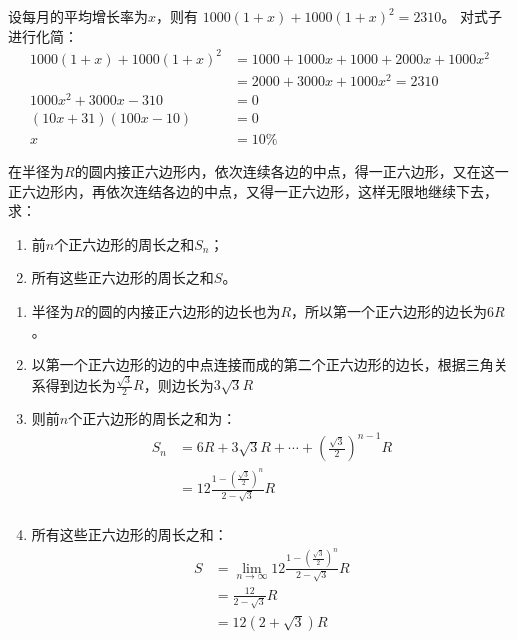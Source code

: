 \documentclass[answers]{exam}
\begin{document}
\begin{questions}
\begin{enumerate}[label=(\arabic*)]
		      \begin{solution}
			      设每月的平均增长率为$x$，则有 	\( 1000(1+x) + 1000(1+x)^2 = 2310 \)。
			      对式子进行化简：
			      \begin{align*}
				      1000(1+x) + 1000(1+x)^2 & = 1000 + 1000x + 1000 + 2000x + 1000x^2 \\
				                              & = 2000 + 3000x + 1000x^2 = 2310         \\
				      1000x^2 +3000x - 310    & = 0                                     \\
				      (10x + 31)(100x - 10)   & = 0                                     \\
				      x                       & = 10\%
			      \end{align*}
		      \end{solution}
	\end{enumerate}
	\question 在半径为$R$的圆内接正六边形内，依次连续各边的中点，得一正六边形，又在这一正六边形内，再依次连结各边的中点，又得一正六边形，这样无限地继续下去，求：
	\begin{enumerate}[label=(\arabic*)]
		\item 前$n$个正六边形的周长之和$S_n$；
		\item 所有这些正六边形的周长之和$S$。
	\end{enumerate}
	\begin{solution}
		\begin{enumerate}[label=\zhnum{*}、]
			\item 半径为$R$的圆的内接正六边形的边长也为$R$，所以第一个正六边形的边长为$6R$。
			\item
			      以第一个正六边形的边的中点连接而成的第二个正六边形的边长，根据三角关系得到边长为$\frac{\sqrt{3}}{2}R$，则边长为$3\sqrt{3}R$
			\item 则前$n$个正六边形的周长之和为：
			      \begin{align*}
				      S_n & = 6R + 3\sqrt{3}R + \cdots +  (\frac{\sqrt{3}}{2})^{n-1}R \\
				          & = 12\frac{1-(\frac{\sqrt{3}}{2})^n}{2-\sqrt{3}}R          \\
			      \end{align*}
			\item 所有这些正六边形的周长之和：
			      \begin{align*}
				      S & = \lim_{n\to\infty}12\frac{1-(\frac{\sqrt{3}}{2})^n}{2-\sqrt{3}}R \\
				        & = \frac{12}{2-\sqrt{3}}R                                          \\
				        & = 12(2+\sqrt{3})R
			      \end{align*}
		\end{enumerate}
	\end{solution}


\end{questions}
\end{document}
